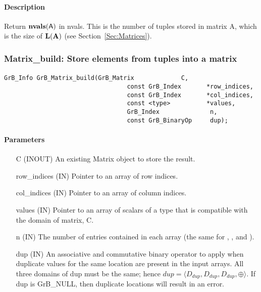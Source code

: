 \paragraph{Description}

Return $\mathbf{nvals}({\sf A})$ in {\sf nvals}.  This is the number of tuples 
stored in matrix {\sf A}, which is the size of $\mathbf{L}({\bf A})$
(see Section~\ref{Sec:Matrices}).


\subsubsection{{\sf Matrix\_build}: Store elements from tuples into a matrix }
\label{Sec:Matrix_build}

\paragraph{\syntax}

\begin{Verbatim}[samepage=true]    
        GrB_Info GrB_Matrix_build(GrB_Matrix             C,
                                  const GrB_Index       *row_indices,
                                  const GrB_Index       *col_indices, 
                                  const <type>          *values,
                                  GrB_Index              n,
                                  const GrB_BinaryOp     dup);
\end{Verbatim}

\paragraph{Parameters}

\begin{itemize}[leftmargin=1.1in]
    \item[{\sf C}]      ({\sf INOUT}) An existing Matrix object to store the result.
    \item[{\sf row\_indices}] ({\sf IN}) Pointer to an array of row indices. 
    \item[{\sf col\_indices}] ({\sf IN}) Pointer to an array of column indices. 
    \item[{\sf values}] ({\sf IN}) Pointer to an array of scalars of a type that
                                   is compatible with the domain of matrix, {\sf C}.
    \item[{\sf n}]  ({\sf IN}) The number of entries contained in each array (the same for , , and ).
    \item[{\sf dup}]    ({\sf IN}) An associative and commutative binary operator 
    to apply when duplicate values for the same location are present in the input
    arrays. All three domains of {\sf dup} must be the same; hence
	    $dup=\langle D_{dup},D_{dup},D_{dup},\oplus \rangle$.
    If {\sf dup} is {\sf GrB\_NULL}, then duplicate locations will result in an error. 
\end{itemize}    

